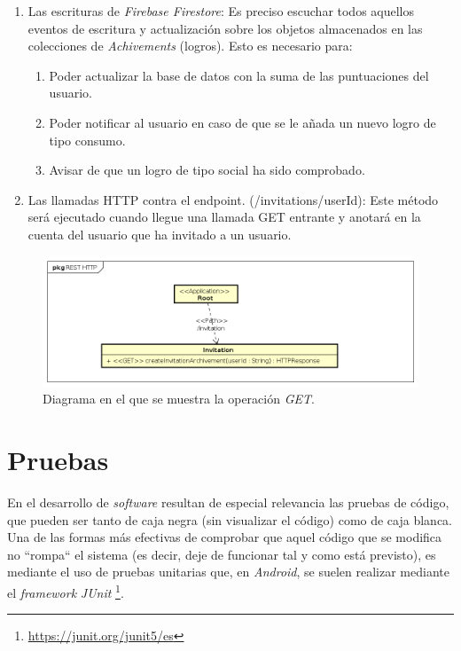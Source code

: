 \documentclass[twoside]{report}
\begin{document}
\begin{enumerate}
\item Las escrituras de \textit{Firebase Firestore}: Es preciso escuchar todos aquellos eventos de escritura y actualización sobre los objetos almacenados en las colecciones de \textit{Achivements} (logros). Esto es necesario para:
	\begin{enumerate}
		\item Poder actualizar la base de datos con la suma de las puntuaciones del usuario.
		\item Poder notificar al usuario en caso de que se le añada un nuevo logro de tipo consumo.
		\item Avisar de que un logro de tipo social ha sido comprobado.
	\end{enumerate}

\item Las llamadas HTTP contra el endpoint. (/invitations/{userId}): Este método será ejecutado cuando llegue una llamada GET entrante y anotará en la cuenta del usuario que ha invitado a un usuario.
\end{enumerate}


\begin{figure}[H]
\centering
\includegraphics[width=\textwidth]{images/restAPI}
\caption{Diagrama en el que se muestra la operación \textit{GET}.}
\end{figure}

\section{Pruebas}


En el desarrollo de \textit{software} resultan de especial relevancia las pruebas de código, que pueden ser tanto de caja negra (sin visualizar el código) como de caja blanca. Una de las formas más efectivas de comprobar que aquel código que se modifica no “rompa“ el sistema (es decir, deje de funcionar tal y como está previsto), es mediante el uso de pruebas unitarias que, en \textit{Android}, se suelen realizar mediante el \textit{framework} \textit{JUnit} \footnote{\url{https://junit.org/junit5/es}}. 
\end{document}
